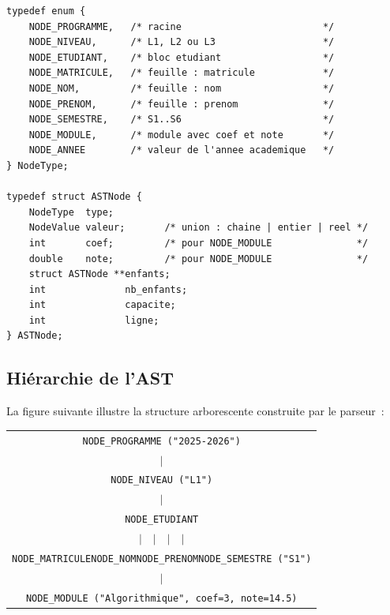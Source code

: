 \documentclass[a4paper,12pt]{article}
\begin{document}
\begin{lstlisting}[caption={Structure d'un nœud AST dans ast.h}, style=c, label=lst:ast-struct]
typedef enum {
    NODE_PROGRAMME,   /* racine                         */
    NODE_NIVEAU,      /* L1, L2 ou L3                   */
    NODE_ETUDIANT,    /* bloc etudiant                  */
    NODE_MATRICULE,   /* feuille : matricule            */
    NODE_NOM,         /* feuille : nom                  */
    NODE_PRENOM,      /* feuille : prenom               */
    NODE_SEMESTRE,    /* S1..S6                         */
    NODE_MODULE,      /* module avec coef et note       */
    NODE_ANNEE        /* valeur de l'annee academique   */
} NodeType;

typedef struct ASTNode {
    NodeType  type;
    NodeValue valeur;       /* union : chaine | entier | reel */
    int       coef;         /* pour NODE_MODULE               */
    double    note;         /* pour NODE_MODULE               */
    struct ASTNode **enfants;
    int              nb_enfants;
    int              capacite;
    int              ligne;
} ASTNode;
\end{lstlisting}

\subsection{Hiérarchie de l'AST}

La figure suivante illustre la structure arborescente construite par le parseur~:

\begin{center}
\renewcommand{\arraystretch}{1.2}
\begin{tabular}{c}
\texttt{NODE\_PROGRAMME ("2025-2026")} \\
$\vert$ \\
\texttt{NODE\_NIVEAU ("L1")} \\
$\vert$ \\
\texttt{NODE\_ETUDIANT} \\
$\big\vert\quad\big\vert\quad\big\vert\quad\big\vert$ \\
\texttt{NODE\_MATRICULE\quad NODE\_NOM\quad NODE\_PRENOM\quad NODE\_SEMESTRE ("S1")} \\
\hspace{14em}$\vert$ \\
\hspace{14em}\texttt{NODE\_MODULE ("Algorithmique", coef=3, note=14.5)} \\
\end{tabular}
\end{center}
\end{document}
